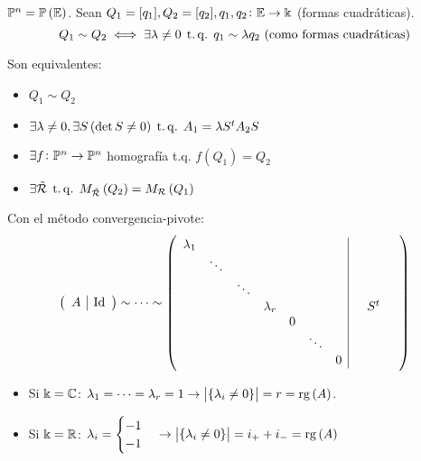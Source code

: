 \begin{defi}
    $\mathbb{P}^n = \mathbb{P}\left( \mathbb{E} \right)$. Sean $Q_1 = [q_1], Q_2 = [q_2], q_1,q_2 \colon \mathbb{E} \to \Bbbk$ (formas cuadráticas).
    \[
        Q_1 \sim Q_2 \iff \exists \lambda \neq 0 \operatorname{\;t.q.\;} q_1\sim \lambda q_2 \text{ (como formas cuadráticas)}
    \]
\end{defi}
\begin{obs}
    Son equivalentes:
    \begin{itemize}
        \item $Q_1 \sim Q_2$
        \item $\exists \lambda \neq 0, \exists S \left( \det S\neq 0\right) \operatorname{\;t.q.\;} A_1 = \lambda S^tA_2S$
        \item $\exists f\colon \mathbb{P}^n \to \mathbb{P}^n$ homografía t.q. $f\left( Q_1 \right) = Q_2$
        \item $\exists \tilde{\mathcal{R}} \operatorname{\;t.q.\;} M_{\tilde{\mathcal{R}}} \left( Q_2 \right) = M_{\mathcal{R}}\left( Q_1 \right)$
    \end{itemize}
\end{obs}
\begin{obs}
    Con el método convergencia-pivote: 
    \[
        \left( 
        \begin{array}{c|c}
            A & \operatorname{Id}
        \end{array} \right)
        \sim \dots \sim
        \left( 
        \begin{array}{ccccccc|c}
            \lambda_1 & & & & & & & \\
            & \ddots & & & & & & \\
            & & \ddots & & & & & \\
            & & & \lambda_r & & & &\quad S^t\quad \\
            & & & & 0 & & & \\
            & & & & & \ddots & & \\
            & & & & & & 0 & \\
        \end{array}
        \right)
    \]
    \begin{itemize}
        \item Si $\Bbbk = \mathbb{C}$: $\lambda_1 = \dots = \lambda_r = 1 \to \begin{vmatrix}\left\{ \lambda_i\neq 0 \right\}\end{vmatrix} = r = \operatorname{rg}\left( A \right)$.
        \item Si $\Bbbk = \mathbb{R}$: $\lambda_i =
            \begin{cases}
                -1 \\
                -1
            \end{cases}
            \to \begin{vmatrix}\left\{ \lambda_i\neq 0 \right\}\end{vmatrix} = i_+ + i_- = \operatorname{rg}\left( A \right)$
    \end{itemize}
\end{obs}

